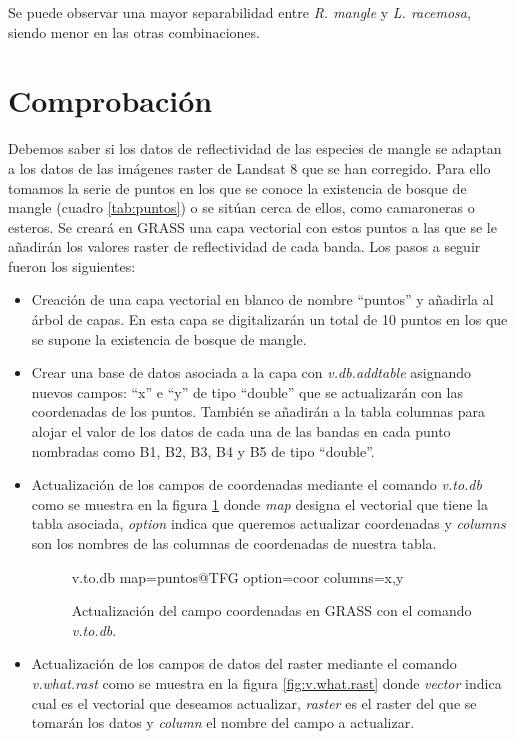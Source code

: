 Se puede observar una mayor separabilidad entre \textit{R. mangle} y \textit{L. racemosa}, siendo menor en las otras combinaciones.

\section{Comprobación}
Debemos saber si los datos de reflectividad de las especies de mangle se adaptan a los datos de las imágenes raster de Landsat 8 que se han corregido. Para ello tomamos la serie de puntos en los que se conoce la existencia de bosque de mangle (cuadro \ref{tab:puntos}) o se sitúan cerca de ellos, como camaroneras o esteros. Se creará en GRASS una capa vectorial con estos puntos a las que se le añadirán los valores raster de reflectividad de cada banda. Los pasos a seguir fueron los siguientes:

\begin{itemize}
	\item Creación de una capa vectorial en blanco de nombre ``puntos'' y añadirla al árbol de capas. En esta capa se digitalizarán un total de 10 puntos en los que se supone la existencia de bosque de mangle.
	\item Crear una base de datos asociada a la capa con \textit{v.db.addtable} asignando nuevos campos: ``x'' e ``y'' de tipo ``double'' que se actualizarán con las coordenadas de los puntos. También se añadirán a la tabla columnas para alojar el valor de los datos de cada una de las bandas en cada punto nombradas como B1, B2, B3, B4 y B5 de tipo ``double''.
	\item Actualización de los campos de coordenadas mediante el comando \textit{v.to.db} como se muestra en la figura \ref{fig:v.to.db} donde \textit{map} designa el vectorial que tiene la tabla asociada, \textit{option} indica que queremos actualizar coordenadas y \textit{columns} son los nombres de las columnas de coordenadas de nuestra tabla.
	
\begin{figure}[ht]
\centering
\begin{boxedverbatim}
	v.to.db map=puntos@TFG option=coor columns=x,y
\end{boxedverbatim}
\caption[Actualización de coordenadas]{Actualización del campo coordenadas en GRASS con el comando \textit{v.to.db}.}
\label{fig:v.to.db}
\end{figure}	
	
	\item Actualización de los campos de datos del raster mediante el comando \textit{v.what.rast} como se muestra en la figura \ref{fig:v.what.rast} donde \textit{vector} indica cual es el vectorial que deseamos actualizar, \textit{raster} es el raster del que se tomarán los datos y \textit{column} el nombre del campo a actualizar.
\end{itemize}

